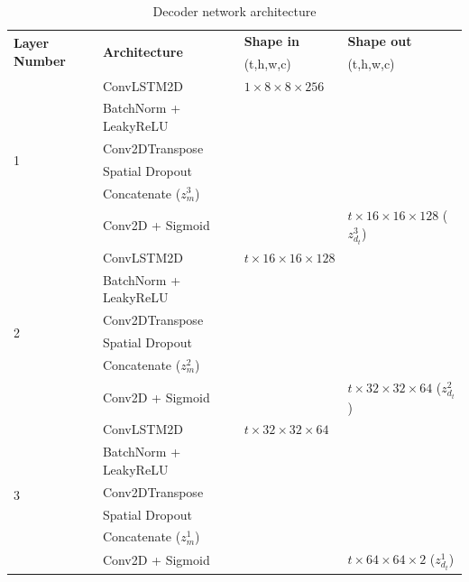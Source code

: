 \documentclass[10pt, twoside]{article}
\begin{document}
\begin{table}[t]
    \caption{Decoder network architecture}\label{tab2}
    \centering
    \begin{tabular}{@{} llll @{} }
    \toprule
        \multirow{2}{*}{\textbf{Layer Number}} & \multirow{2}{*}{\textbf{Architecture}} &
        \textbf{Shape in} & \textbf{Shape out} \\ & & (t,h,w,c) & (t,h,w,c) \\
    \midrule
        \multirow{6}{*}{1} & ConvLSTM2D & $1\times8\times8\times256$ & \\
                           & BatchNorm + LeakyReLU & & \\
                           & Conv2DTranspose       & & \\
                           & Spatial Dropout       & & \\
                           & Concatenate ($z_m^3$) & & \\
                           & Conv2D + Sigmoid      & & $t\times16\times16\times128$ ($z_{d_t}^3$) \\
        \hline                      
        \multirow{6}{*}{2} & ConvLSTM2D & $t\times16\times16\times128$ & \\
                           & BatchNorm + LeakyReLU & & \\
                           & Conv2DTranspose       & & \\
                           & Spatial Dropout       & & \\
                           & Concatenate ($z_m^2$) & & \\
                           & Conv2D + Sigmoid      & & $t\times32\times32\times64$ ($z_{d_t}^2$) \\
        \hline
        \multirow{6}{*}{3} & ConvLSTM2D & $t\times32\times32\times64$ & \\
                           & BatchNorm + LeakyReLU & & \\
                           & Conv2DTranspose       & & \\
                           & Spatial Dropout       & & \\
                           & Concatenate ($z_m^1$) & & \\
                           & Conv2D + Sigmoid      & & $t\times64\times64\times2$ ($z_{d_t}^1$) \\
    \bottomrule
    \end{tabular}
\end{table}
\end{document}
